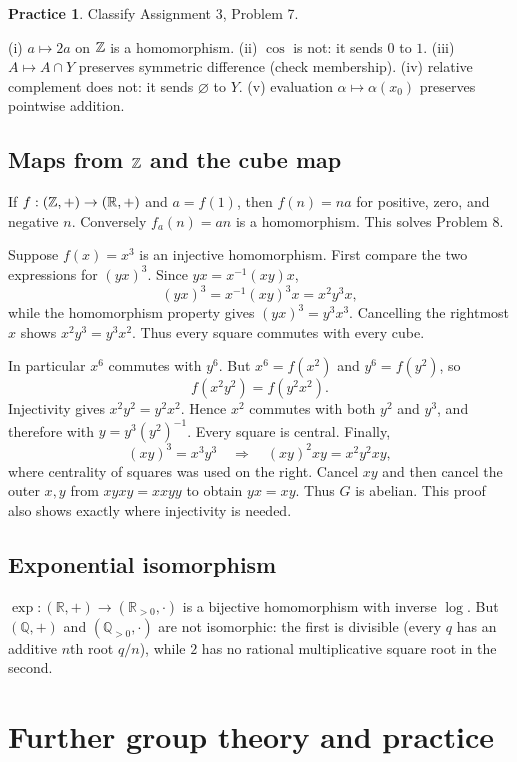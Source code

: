 \documentclass[11pt,openany]{book}
\newcommand{\Q}{\mathbb Q}\newcommand{\R}{\mathbb R}
\theoremstyle{definition}
\newtheorem{exercise}[theorem]{Practice}
\begin{document}
\begin{exercise}Classify Assignment 3, Problem 7.\end{exercise}
\begin{solution}
(i) $a\mapsto2a$ on $\mathbb Z$ is a homomorphism. (ii) $\cos$ is not: it sends $0$ to $1$. (iii) $A\mapsto A\cap Y$ preserves symmetric difference (check membership). (iv) relative complement does not: it sends $\varnothing$ to $Y$. (v) evaluation $\alpha\mapsto\alpha(x_0)$ preserves pointwise addition.
\end{solution}

\section{Maps from $\mathbb Z$ and the cube map}
If $f:(\Z,+)\to(\R,+)$ and $a=f(1)$, then $f(n)=na$ for positive, zero, and negative $n$. Conversely $f_a(n)=an$ is a homomorphism. This solves Problem 8.

Suppose $f(x)=x^3$ is an injective homomorphism. First compare the two
expressions for $(yx)^3$. Since $yx=x^{-1}(xy)x$,
\[
(yx)^3=x^{-1}(xy)^3x=x^2y^3x,
\]
while the homomorphism property gives $(yx)^3=y^3x^3$. Cancelling the
rightmost $x$ shows $x^2y^3=y^3x^2$. Thus every square commutes with
every cube.

In particular $x^6$ commutes with $y^6$. But
$x^6=f(x^2)$ and $y^6=f(y^2)$, so
\[
f(x^2y^2)=f(y^2x^2).
\]
Injectivity gives $x^2y^2=y^2x^2$. Hence $x^2$ commutes with both $y^2$
and $y^3$, and therefore with $y=y^3(y^2)^{-1}$. Every square is central.
Finally,
\[
(xy)^3=x^3y^3
\quad\Longrightarrow\quad
(xy)^2xy=x^2y^2xy,
\]
where centrality of squares was used on the right. Cancel $xy$ and then
cancel the outer $x,y$ from $xyxy=xxyy$ to obtain $yx=xy$. Thus $G$ is
abelian. This proof also shows exactly where injectivity is needed.

\section{Exponential isomorphism}
$\exp:(\R,+)\to(\R_{>0},\cdot)$ is a bijective homomorphism with inverse $\log$. But $(\Q,+)$ and $(\Q_{>0},\cdot)$ are not isomorphic: the first is divisible (every $q$ has an additive $n$th root $q/n$), while $2$ has no rational multiplicative square root in the second.


\chapter{Further group theory and practice}
\end{document}
